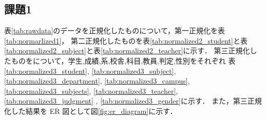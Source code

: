 \documentclass[a4paper,11pt]{ltjsarticle}
\begin{document}
\subsection{課題1}
表\ref{tab:rawdata}のデータを正規化したものについて，第一正規化を表\ref{tab:normarlized1}，
第二正規化したものを表\ref{tab:normalized2_student}と表\ref{tab:normalized2_subject}と表\ref{tab:normalized2_teacher}に示す．
第三正規化したものをについて，学生,成績,系,校舎,科目,教員,判定,性別をそれぞれ
表\ref{tab:normalized3_student}, \ref{tab:normalized3_subject}, \ref{tab:normalized3_department}, \ref{tab:normalized3_campus}, \ref{tab:normalized3_subjects}, \ref{tab:normalized3_teacher}, \ref{tab:normalized3_judgment}
, \ref{tab:normalized3_gender}に示す．
また，第三正規化した結果を ER 図として図\ref{fig:er_diagram}に示す．
\begin{table}[htbp]
  \centering
  \caption{第1正規化}
  \label{tab:normarlized1}
\end{table}
\end{document}
